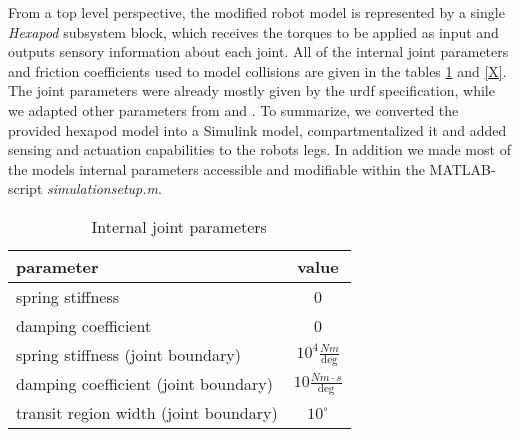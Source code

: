 From a top level perspective, the modified robot model is represented by a single \textit{Hexapod} subsystem block, which receives the torques to be applied as input and outputs sensory information about each joint.
All of the internal joint parameters and friction coefficients used to model collisions are given in the tables \ref{table: Joint parameters} and \ref{X}.
The joint parameters were already mostly given by the urdf specification, while we adapted other parameters from \parencite{AUTHOR} and \parencite{AUTHOR2}.
To summarize, we converted the provided hexapod model into a Simulink model, compartmentalized it and added sensing and actuation capabilities to the robots legs.
In addition we made most of the models internal parameters accessible and modifiable within the MATLAB-script \textit{simulationsetup.m}.



\begin{comment}
The  thorax is represented by a rigid body and a main coordinate frame.
Each of the robots legs consists of 3 rigid bodies(coxa, femur and tibia) which are connected to each other by 2 joints.
A third joint then attaches the coxa and the leg as a whole to the main body.
Like the leg of an insect, the movement plane of the joint connecting coxa and thorax is parallel to the ground and orthogonal towards the other two joints.
Each of the joints used has 1 (rotational) DoF.
To position each rigid body and joint correctly, rigid transformations are used to translate and rotate each component.

As mentioned above, joints can receive as input a torque to be applied and can output sensory data, such as the joints position, velocity and acceleration. 
\end{comment}


\begin{table}
	\centering
	\begin{tabular}{| l | c |}
		\hline
		\textbf{parameter} & \textbf{value} \\
		\hline
		spring stiffness & 0 \\
		\hline
		damping coefficient & 0 \\
		\hline
		spring stiffness (joint boundary) & $10^4 \frac{Nm}{\text{deg}}$ \\
		\hline
		damping coefficient (joint boundary) &  $10 \frac{Nm \cdot s}{\text{deg}}$\\
		\hline
		transit region width (joint boundary) &  $10^{\circ}$\\
		\hline
	\end{tabular}
	\caption{Internal joint parameters}
	\label{table: Joint parameters}
\end{table}


